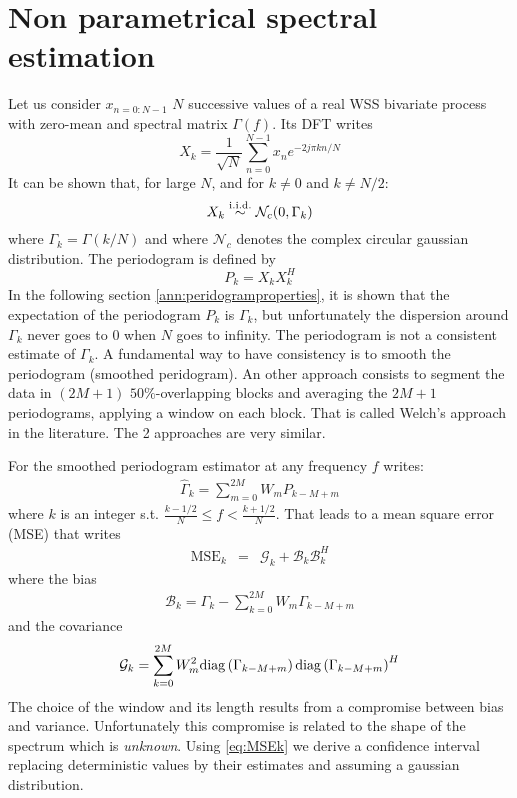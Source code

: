 \section{Non parametrical spectral estimation}
Let us consider $x_{n=0:N-1}$ $N$ successive values of a real WSS bivariate process with zero-mean and spectral matrix $\Gamma(f)$. Its DFT writes
$$
 X_{k}=\frac{1}{\sqrt{N}}\sum_{n=0}^{N-1}x_{n}e^{-2j\pi kn/N}
$$
It can be shown that, for large $N$, and for $k\neq 0$ and $k\neq N/2$:
$$
 X_{k}\stackrel{\mathrm{i.i.d.}}{\sim}\mathcal{N}_{c}(0,\Gamma_{k})
$$
where $\Gamma_{k}=\Gamma(k/N)$ and where $\mathcal{N}_{c}$ denotes the complex circular gaussian distribution. The periodogram is defined by 
$$
 P_{k}=X_{k}X_{k}^{H}
$$
In the following section \ref{ann:peridogramproperties}, it is shown that the expectation of the periodogram $P_{k}$ is $\Gamma_{k}$, but unfortunately the dispersion around $\Gamma_{k}$ never goes to 0 when $N$ goes to infinity. The periodogram is not a consistent estimate of $\Gamma_{k}$. A fundamental way to have consistency is to smooth the periodogram (smoothed peridogram). An other approach consists to segment the data in $(2M+1)$ $50\%$-overlapping blocks and averaging the $2M+1$ periodograms, applying a window on each block. That is called Welch's approach in the literature. The 2 approaches are very similar.

For the smoothed periodogram estimator at any frequency $f$ writes: 
\begin{eqnarray}
 \label{eq:smoothedperiodogram}
  \widehat{\Gamma}_{k}=\sum_{m=0}^{2M}W_{m}P_{k-M+m}
\end{eqnarray}
where $k$ is an integer s.t. $\frac{k-1/2}{N}\leq f < \frac{k+1/2}{N}$. That leads to a mean square error (MSE) that writes
\begin{eqnarray}
\label{eq:MSEk}
 \mathrm{MSE}_{k}
 &=&
 \mathcal{G}_{k}+\mathcal{B}_{k}\mathcal{B}_{k}^{H}
\end{eqnarray}
where the bias
\begin{eqnarray}
\label{eq:biassmoothperiodogram}
 \mathcal{B}_{k}= \Gamma_{k}-\sum_{k=0}^{2M}W_{m}\Gamma_{k-M+m}
\end{eqnarray}
and the covariance
\begin{eqnarray}
\label{eq:varGammak}
 \mathcal{G}_{k}= \sum_{k=0}^{2M}W_{m}^{2}
 \mathrm{diag}\left( \Gamma_{k-M+m} \right)\mathrm{diag}\left( \Gamma_{k-M+m} \right)^{H}
\end{eqnarray}
The choice of the window and its length results from a compromise between bias and variance. Unfortunately this compromise is related to the shape of the spectrum which is \emph{unknown}. Using \eqref{eq:MSEk} we derive a confidence interval replacing deterministic values by their estimates and assuming a gaussian distribution.


